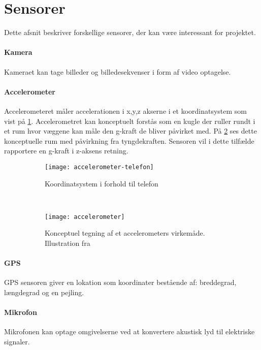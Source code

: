 \section{Sensorer}\label{sensorer}
Dette afsnit beskriver forskellige sensorer, der kan være interessant for projektet. 

\paragraph{Kamera}
Kameraet kan tage billeder og billedesekvenser i form af video optagelse.

\paragraph{Accelerometer}
Accelerometeret måler accelerationen i x,y,z akserne i et koordinatsystem som vist på \cref{analyse:accelerometer:koo}.
Accelerometret kan konceptuelt forstås som en kugle der ruller rundt i et rum hvor væggene kan måle den g-kraft de bliver påvirket med.
På \cref{analyse:accelerometer:kraft} ses dette konceptuelle rum med påvirkning fra tyngdekraften. 
Sensoren vil i dette tilfælde rapportere en g-kraft i z-aksens retning.

\begin{figure}[h]
	\centering
	\begin{subfigure}[b]{0.47\textwidth}
		\centering
		\texttt{[image: accelerometer-telefon]}
		\caption{Koordinatsystem i forhold til telefon}
		\label{analyse:accelerometer:koo}
	\end{subfigure}
	~
	\begin{subfigure}[b]{0.47\textwidth}
		\centering
		\texttt{[image: accelerometer]}
		\caption{Konceptuel tegning af et accelerometers virkemåde. Illustration fra \cite{accelerometer}}
		\label{analyse:accelerometer:kraft}
	\end{subfigure}
	\caption{}
	\label{accelerometer}
\end{figure} 

\paragraph{GPS}
GPS sensoren giver en lokation som koordinater bestående af: breddegrad, længdegrad og en pejling.

\paragraph{Mikrofon}
Mikrofonen kan optage omgivelserne ved at konvertere akustisk lyd til elektriske signaler.

